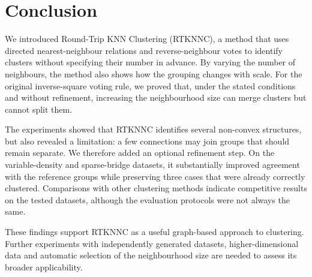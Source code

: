 \documentclass[pdflatex,sn-basic,Numbered]{sn-jnl}
\begin{document}
\section{Conclusion}\label{sec:conclusion}

We introduced Round-Trip KNN Clustering (RTKNNC), a method that uses directed nearest-neighbour relations and reverse-neighbour votes to identify clusters without specifying their number in advance. By varying the number of neighbours, the method also shows how the grouping changes with scale. For the original inverse-square voting rule, we proved that, under the stated conditions and without refinement, increasing the neighbourhood size can merge clusters but cannot split them.

The experiments showed that RTKNNC identifies several non-convex structures, but also revealed a limitation: a few connections may join groups that should remain separate. We therefore added an optional refinement step. On the variable-density and sparse-bridge datasets, it substantially improved agreement with the reference groups while preserving three cases that were already correctly clustered. Comparisons with other clustering methods indicate competitive results on the tested datasets, although the evaluation protocols were not always the same.

These findings support RTKNNC as a useful graph-based approach to clustering. Further experiments with independently generated datasets, higher-dimensional data and automatic selection of the neighbourhood size are needed to assess its broader applicability.
\end{document}
